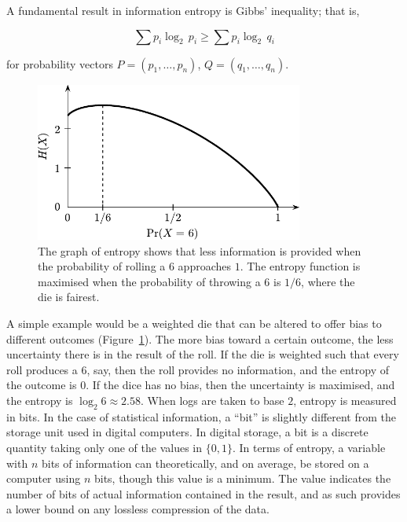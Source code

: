 A fundamental result in information entropy is Gibbs' inequality; that is,

$$
	\sum p_i \log_2 \, p_i \geq \sum p_i \log_2 \, q_i
$$

for probability vectors $P = (p_1, \dots, p_n)$, $Q = (q_1, \dots, q_n)$.

\begin{figure}[ht]
	\centering
	\includegraphics[width=250pt]{figures/weighted_die.pdf}
	\caption[Graph showing entropy of a weighted die]{The graph of entropy shows that less information is provided when the probability of rolling a $6$ approaches $1$. The entropy function is maximised when the probability of throwing a $6$ is $1/6$, where the die is fairest.}
	\label{weighted_die}
\end{figure}

A simple example would be a weighted die that can be altered to offer bias to different outcomes (Figure~\ref{weighted_die}). The more bias toward a certain outcome, the less uncertainty there is in the result of the roll. If the die is weighted such that every roll produces a $6$, say, then the roll provides no information, and the entropy of the outcome is $0$. If the dice has no bias, then the uncertainty is maximised, and the entropy is $\log_2 6 \approx 2.58$. When logs are taken to base $2$, entropy is measured in bits. In the case of statistical information, a ``bit'' is slightly different from the storage unit used in digital computers. In digital storage, a bit is a discrete quantity taking only one of the values in $\{0, 1\}$. In terms of entropy, a variable with $n$ bits of information can theoretically, and on average, be stored on a computer using $n$ bits, though this value is a minimum. The value indicates the number of bits of actual information contained in the result, and as such provides a lower bound on any lossless compression of the data. 

